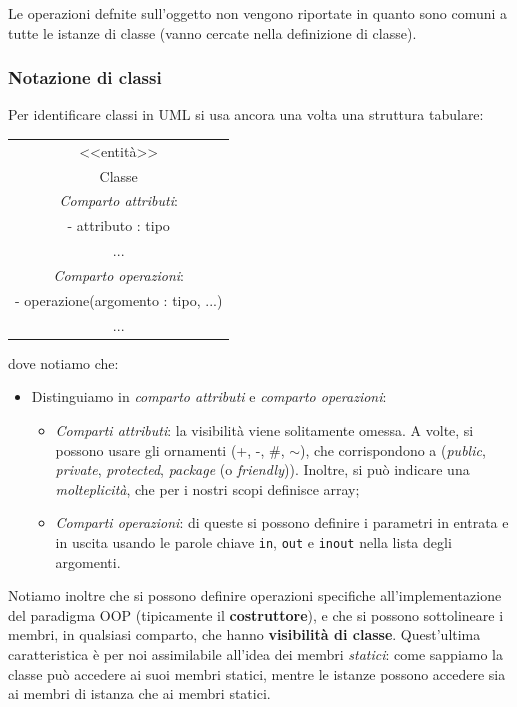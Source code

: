 \documentclass[a4paper,11pt]{article}
\begin{document}
Le operazioni defnite sull'oggetto non vengono riportate in quanto sono comuni a tutte le istanze di classe (vanno cercate nella definizione di classe). 

\subsubsection{Notazione di classi}
Per identificare classi in UML si usa ancora una volta una struttura tabulare:
\begin{table}[H]
	\center 
	\begin{tabular} { | c | }
		\hline
		<<entità>> \\ 
		Classe \\
		\hline
		\textit{Comparto attributi}: \\ 
		- attributo : tipo \\
		... \\ 
		\hline
		\textit{Comparto operazioni}: \\ 
		- operazione(argomento : tipo, ...) \\ 
		... \\
		\hline
	\end{tabular}
\end{table}
dove notiamo che:
\begin{itemize}
	\item Distinguiamo in \textit{comparto attributi} e \textit{comparto operazioni}:
		\begin{itemize}
			\item \textit{Comparti attributi}: la visibilità viene solitamente omessa. A volte, si possono usare gli ornamenti (+, -, $\#$, $\sim$), che corrispondono a (\textit{public}, \textit{private}, \textit{protected}, \textit{package} (o \textit{friendly})). Inoltre, si può indicare una \textit{molteplicità}, che per i nostri scopi definisce array;
			\item \textit{Comparti operazioni}: di queste si possono definire i parametri in entrata e in uscita usando le parole chiave \lstinline|in|, \lstinline|out| e \lstinline|inout| nella lista degli argomenti.
		\end{itemize}
\end{itemize}

Notiamo inoltre che si possono definire operazioni specifiche all'implementazione del paradigma OOP (tipicamente il \textbf{costruttore}), e che si possono sottolineare i membri, in qualsiasi comparto, che hanno \textbf{visibilità di classe}.
Quest'ultima caratteristica è per noi assimilabile all'idea dei membri \textit{statici}: come sappiamo la classe può accedere ai suoi membri statici, mentre le istanze possono accedere sia ai membri di istanza che ai membri statici.
\end{document}
